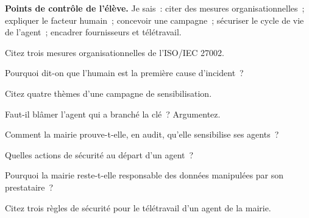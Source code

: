 \begin{boxinfo}
\textbf{Points de contrôle de l'élève.} Je sais~: citer des mesures
organisationnelles~; expliquer le facteur humain~; concevoir une campagne~;
sécuriser le cycle de vie de l'agent~; encadrer fournisseurs et télétravail.
\end{boxinfo}

\bigskip

\begin{boxexo}[title={\ding{45}\quad Exercice~15.1. Mesures organisationnelles \niveaubase}]
Citez trois mesures organisationnelles de l'ISO/IEC 27002.
\end{boxexo}

\begin{boxexo}[title={\ding{45}\quad Exercice~15.2. Facteur humain \niveaubase}]
Pourquoi dit-on que l'humain est la première cause d'incident~?
\end{boxexo}

\begin{boxexo}[title={\ding{45}\quad Exercice~15.3. Thèmes \niveaubase}]
Citez quatre thèmes d'une campagne de sensibilisation.
\end{boxexo}

\begin{boxexo}[title={\ding{45}\quad Exercice~15.4. Blâmer qui \niveaumoyen}]
Faut-il blâmer l'agent qui a branché la clé~? Argumentez.
\end{boxexo}

\begin{boxexo}[title={\ding{45}\quad Exercice~15.5. Prouver la formation \niveaumoyen}]
Comment la mairie prouve-t-elle, en audit, qu'elle sensibilise ses agents~?
\end{boxexo}

\begin{boxexo}[title={\ding{45}\quad Exercice~15.6. Départ d'un agent \niveaumoyen}]
Quelles actions de sécurité au départ d'un agent~?
\end{boxexo}

\begin{boxexo}[title={\ding{45}\quad Exercice~15.7. Risque de tiers \niveaumoyen}]
Pourquoi la mairie reste-t-elle responsable des données manipulées par son
prestataire~?
\end{boxexo}

\begin{boxexo}[title={\ding{45}\quad Exercice~15.8. Télétravail \niveaumoyen}]
Citez trois règles de sécurité pour le télétravail d'un agent de la mairie.
\end{boxexo}

